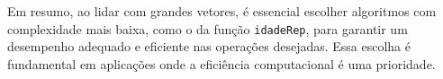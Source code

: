 Em resumo, ao lidar com grandes vetores, é essencial escolher algoritmos com complexidade mais baixa, como o da função \texttt{idadeRep}, para garantir um desempenho adequado e eficiente nas operações desejadas. Essa escolha é fundamental em aplicações onde a eficiência computacional é uma prioridade.
